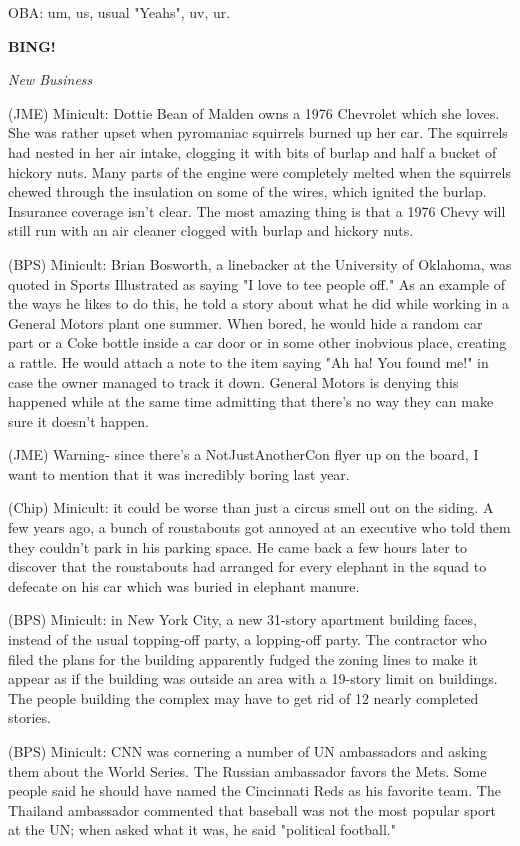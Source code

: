 \documentclass[12pt]{article}
\newcommand{\bing}{{\bf BING!} }
\newcommand{\goto}[1]{\bing \vskip 12pt \centerline{{\em{#1}}}}
\begin{document}
OBA: um, us, usual "Yeahs", uv, ur.

\goto{New Business}

(JME) Minicult: Dottie Bean of Malden owns a 1976 Chevrolet which she loves. She was rather upset when pyromaniac squirrels burned up her car. The squirrels had nested in her air intake, clogging it with bits of burlap and half a bucket of hickory nuts. Many parts of the engine were completely melted when the squirrels chewed through the insulation on some of the wires, which ignited the burlap. Insurance coverage isn't clear. The most amazing thing is that a 1976 Chevy will still run with an air cleaner clogged with burlap and hickory nuts.

(BPS) Minicult: Brian Bosworth, a linebacker at the University of Oklahoma, was quoted in Sports Illustrated as saying "I love to tee people off." As an example of the ways he likes to do this, he told a story about what he did while working in a General Motors plant one summer. When bored, he would hide a random car part or a Coke bottle inside a car door or in some other inobvious place, creating a rattle. He would attach a note to the item saying "Ah ha! You found me!" in case the owner managed to track it down. General Motors is denying this happened while at the same time admitting that there's no way they can make sure it doesn't happen.

(JME) Warning- since there's a NotJustAnotherCon flyer up on the board, I want to mention that it was incredibly boring last year.

(Chip) Minicult: it could be worse than just a circus smell out on the siding. A few years ago, a bunch of roustabouts got annoyed at an executive who told them they couldn't park in his parking space. He came back a few hours later to discover that the roustabouts had arranged for every elephant in the squad to defecate on his car which was buried in elephant manure.

(BPS) Minicult: in New York City, a new 31-story apartment building faces, instead of the usual topping-off party, a lopping-off party. The contractor who filed the plans for the building apparently fudged the zoning lines to make it appear as if the building was outside an area with a 19-story limit on buildings. The people building the complex may have to get rid of 12 nearly completed stories.

(BPS) Minicult: CNN was cornering a number of UN ambassadors and asking them about the World Series. The Russian ambassador favors the Mets. Some people said he should have named the Cincinnati Reds as his favorite team. The Thailand ambassador commented that baseball was not the most popular sport at the UN; when asked what it was, he said "political football."
\end{document}
